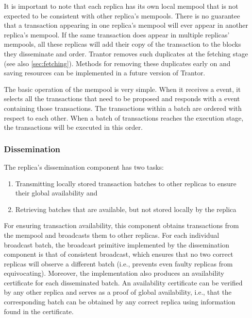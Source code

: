 \documentclass{article}
\begin{document}
It is important to note that each replica has its own local mempool
that is not expected to be consistent with other replica’s mempools.
There is no guarantee that a transaction appearing in one replica’s mempool will ever appear in another replica’s mempool.
If the same transaction does appear in multiple replicas’ mempools,
all these replicas will add their copy of the transaction to the blocks they disseminate and order.
Trantor removes such duplicates at the fetching stage (see also \cref{sec:fetching}).
Methods for removing these duplicates early on and saving resources can be implemented in a future version of Trantor.

The basic operation of the mempool is very simple.
When it receives a  event,
it selects all the transactions that need to be proposed and responds with a  event containing those transactions.
The transactions within a batch are ordered with respect to each other.
When a batch of transactions reaches the execution stage, the transactions will be executed in this order.

\subsubsection{Dissemination}

The replica’s dissemination component has two tasks:
\begin{enumerate}
    \item Transmitting locally stored transaction batches to other replicas to ensure their global availability and
    \item Retrieving batches that are available, but not stored locally by the replica
\end{enumerate}


For ensuring transaction availability, this component obtains transactions from the mempool and broadcasts them to other replicas.
For each individual broadcast batch,
the broadcast primitive implemented by the dissemination component is that of consistent broadcast,
which ensures that no two correct replicas will observe a different batch
(i.e., prevents even faulty replicas from equivocating).
Moreover, the implementation also produces an availability certificate for each disseminated batch.
An availability certificate can be verified by any other replica and serves as a proof of global availability,
i.e., that the corresponding batch can be obtained by any correct replica using information found in the certificate.
\end{document}
